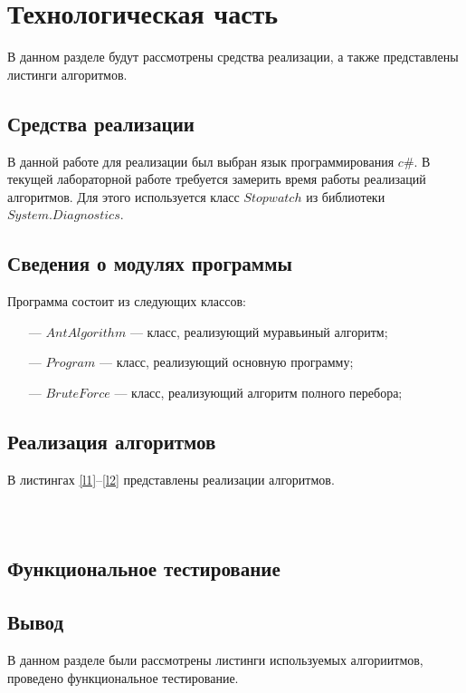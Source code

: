 \chapter{Технологическая часть}
В данном разделе будут рассмотрены средства реализации, а также представлены листинги алгоритмов.

\section{Средства реализации}
В данной работе для реализации был выбран язык программирования $c\#$. В текущей лабораторной работе требуется замерить время работы реализаций алгоритмов. Для этого используется класс  $Stopwatch$ из библиотеки $System.Diagnostics$.
\newpage
\section{Сведения о модулях программы}
Программа состоит из следующих классов:
\begin{itemize}[itemindent=1.25em]
	\item[---] $AntAlgorithm$ --- класс, реализующий муравьиный алгоритм; 
	\item[---] $Program$ --- класс, реализующий основную программу;
    \item[---] $BruteForce$ --- класс, реализующий алгоритм полного перебора;
\end{itemize}

\section{Реализация алгоритмов}
В листингах \ref{l1}--\ref{l2} представлены реализации алгоритмов. 
\begin{center}
\begin{lstlisting}[label=l1, caption={Реалитзация алгоритма полного перебора}]

\end{lstlisting}
\end{center}
\begin{center}
\begin{lstlisting}[label=l2, caption={Реализация муравьиного алгоритма}]
 
\end{lstlisting}
\end{center}


\newpage
\section{Функциональное тестирование}


\section*{\hsp Вывод}

В данном разделе были рассмотрены листинги используемых алгориитмов, проведено функциональное тестирование.
